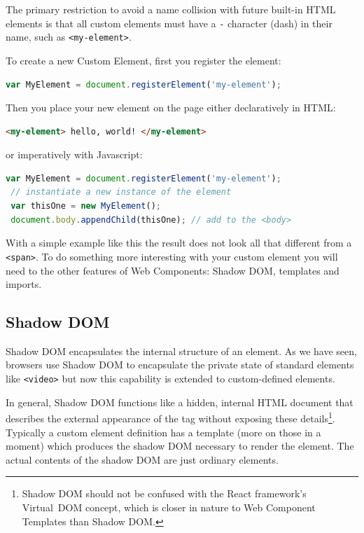 The primary restriction to avoid a name collision with future built-in HTML elements is that all custom elements must have a \texttt{-} character (dash) in their name, such as \texttt{<my-element>}.

To create a new Custom Element, first you register the element:

\begin{lstlisting}[language=Javascript]
 var MyElement = document.registerElement('my-element');
\end{lstlisting}

Then you place your new element on the page either declaratively in HTML:

\begin{lstlisting}[language=html]
 <my-element> hello, world! </my-element>
\end{lstlisting}

or imperatively with Javascript:

\begin{lstlisting}[language=Javascript]
 var MyElement = document.registerElement('my-element');
 // instantiate a new instance of the element
 var thisOne = new MyElement();      
 document.body.appendChild(thisOne); // add to the <body>
\end{lstlisting}


With a simple example like this the result does not look all that different from a \texttt{<span>}.
To do something more interesting with your custom element you will need to the other features of Web Components: Shadow DOM, templates and imports.

\subsection{Shadow DOM}
Shadow DOM encapsulates the internal structure of an element. 
As we have seen, browsers use Shadow DOM to encapsulate the private state of standard elements like \texttt{<video>} but now this capability is extended to custom-defined elements.

In general, Shadow DOM functions like a hidden, internal HTML document that describes the external appearance of the tag without exposing these details\footnote{
Shadow DOM should not be confused with the React framework's Virtual~DOM concept, which is closer in nature to Web Component Templates than Shadow DOM.
}. Typically a custom element definition has a template (more on those in a moment) which produces the shadow DOM necessary to render the element.
The actual contents of the shadow DOM are just ordinary elements.

